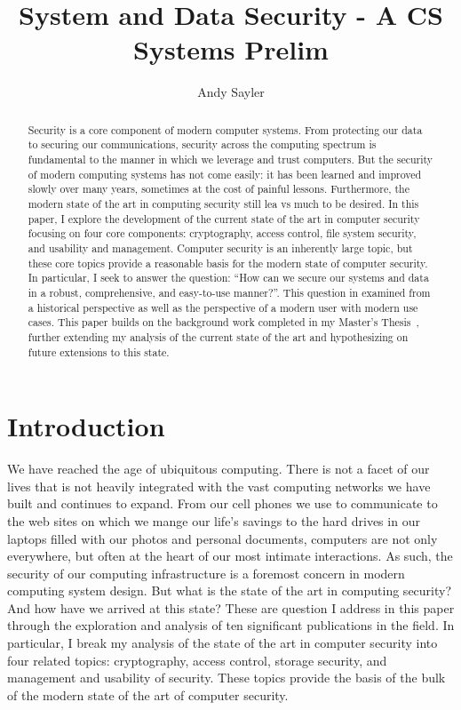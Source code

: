 \documentclass{sig-alternate}
\begin{document}
\title{System and Data Security - A CS Systems Prelim}

\author{
  \alignauthor
  Andy Sayler\\
}

\maketitle

\begin{abstract}
Security is a core component of modern computer systems. From
protecting our data to securing our communications, security across
the computing spectrum is fundamental to the manner in which we
leverage and trust computers. But the security of modern computing
systems has not come easily: it has been learned and improved slowly
over many years, sometimes at the cost of painful
lessons. Furthermore, the modern state of the art in computing
security still lea vs much to be desired. In this paper, I explore the
development of the current state of the art in computer security
focusing on four core components: cryptography, access control, file
system security, and usability and management. Computer security is an
inherently large topic, but these core topics provide a reasonable
basis for the modern state of computer security. In particular, I seek
to answer the question: ``How can we secure our systems and data in a
robust, comprehensive, and easy-to-use manner?''. This question in
examined from a historical perspective as well as the perspective of a
modern user with modern use cases. This paper builds on the background
work completed in my Master's Thesis~\cite{custos-masters}, further
extending my analysis of the current state of the art and
hypothesizing on future extensions to this state.
\end{abstract}

\section{Introduction}
\label{sec:intro}

We have reached the age of ubiquitous computing. There is not a facet
of our lives that is not heavily integrated with the vast computing
networks we have built and continues to expand. From our cell phones
we use to communicate to the web sites on which we mange our life's
savings to the hard drives in our laptops filled with our photos and
personal documents, computers are not only everywhere, but often at
the heart of our most intimate interactions. As such, the security of
our computing infrastructure is a foremost concern in modern computing
system design. But what is the state of the art in computing security?
And how have we arrived at this state? These are question I address in
this paper through the exploration and analysis of ten significant
publications in the field. In particular, I break my analysis of the
state of the art in computer security into four related topics:
cryptography, access control, storage security, and management and
usability of security. These topics provide the basis of the bulk of
the modern state of the art of computer security.
\end{document}
